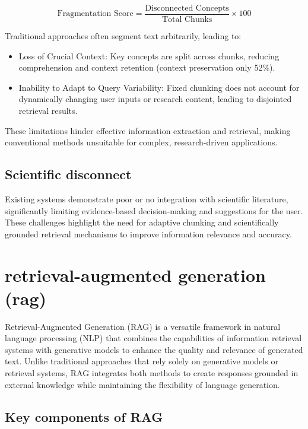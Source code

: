 \documentclass[conference]{IEEEtran}
\begin{document}
\begin{equation}  
\text{Fragmentation Score} = \frac{\text{Disconnected Concepts}}{\text{Total Chunks}} \times 100  
\end{equation}  

Traditional approaches often segment text arbitrarily, leading to:  

\begin{itemize}  
    \item Loss of Crucial Context: Key concepts are split across chunks, reducing comprehension and context retention (context preservation only 52\%).  
    \item Inability to Adapt to Query Variability: Fixed chunking does not account for dynamically changing user inputs or research content, leading to disjointed retrieval results.  
\end{itemize}  

These limitations hinder effective information extraction and retrieval, making conventional methods unsuitable for complex, research-driven applications.  

\subsection{Scientific disconnect}
Existing systems demonstrate poor or no integration with scientific literature, significantly limiting evidence-based decision-making and suggestions for the user.\\

These challenges highlight the need for adaptive chunking and scientifically grounded retrieval mechanisms to improve information relevance and accuracy.  

\section{retrieval-augmented generation (rag)}

Retrieval-Augmented Generation (RAG) is a versatile framework in natural language processing (NLP) that combines the capabilities of information retrieval systems with generative models to enhance the quality and relevance of generated text. Unlike traditional approaches that rely solely on generative models or retrieval systems, RAG integrates both methods to create responses grounded in external knowledge while maintaining the flexibility of language generation. \cite{1} \cite{2}

\subsection{Key components of RAG}
\end{document}
